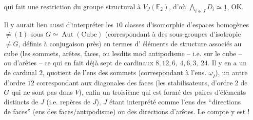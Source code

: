 qui fait une restriction du groupe structural à $V_J(\mathbb{F}_2)$, d'où $\bigwedge_{i\in J}D_i\simeq\underline{1}$, OK.

Il y aurait lieu aussi d'interpréter les $10$ classes d'isomorphie d'espaces homogènes $\ne(1)$ sous $G\simeq\operatorname{Aut}(\text{Cube})$ (correspondant à des  sous-groupes d'isotropie $\ne G$, définis à conjugaison près) en termes d' éléments de structure associés au cube (les sommets, arêtes, faces, ou lesdits mod antipodisme -- i.e. sur le cube  -- ou  d'arêtes -- ce qui en fait déjà sept  de cardinaux $8,12,6,\ 4,6,3,\ 24$.
Il y en a un de cardinal $2$, quotient de l'ens des sommets (correspondant à l'ens. $\underline{\omega}_I$), un autre d'ordre $12$ correspondant aux diagonales des faces  (les stabilisateurs,  d'ordre $2$ de $G$ qui ne sont pas dans $V$), enfin un troisième qui est formé des paires d'éléments distincts de $J$ (i.e. repères de $J$), $J$ étant interprété comme l'ens des ``directions de faces'' \deleted{\unsure{(=}} (ens des faces/antipodisme) ou des directions d'arêtes. Le compte y est !
